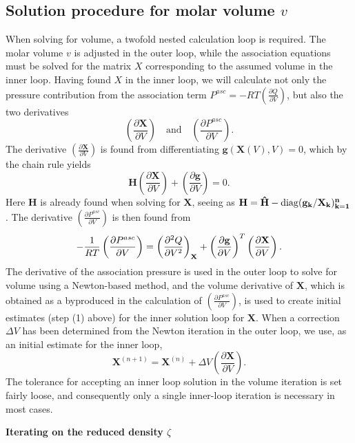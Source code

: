 \documentclass[english]{../thermomemo/thermomemo}
\newcommand{\mbf}[0]{\mathbf}
\newcommand*{\pder}[2]{\left(\frac{\partial #1}{\partial #2}\right)}
\newcommand*{\pdder}[2]{\left(\frac{\partial^2 #1}{\partial #2^2}\right)}
\newcommand{\z}{\zeta}
\begin{document}
\subsection{Solution procedure for molar volume $v$}
When solving for volume, a twofold nested calculation loop is required. The molar volume $v$ is adjusted in the outer loop, while the association equations must be solved for the matrix $X$ corresponding to the assumed volume in the inner loop. Having found $X$ in the inner loop, we will calculate not only the pressure contribution from the association term $P^{asc} = -RT \pder{Q}{V}$, but also the two derivatives
\begin{equation}
  \label{advDeriv}
  \pder{\mbf X}{V} \quad \text{and} \quad \pder{P^{asc}}{V}.
\end{equation}
The derivative $\pder{\mbf X}{V}$ is found from differentiating $\mbf g(\mbf X(V),V) = 0$, which by the chain rule yields
\begin{equation}
  \mbf H \pder{\mbf X}{V} + \pder{\mbf g}{V} = 0.
\end{equation}
Here $\mbf H$ is already found when solving for $\mbf X$, seeing as $\bf H = \bf{\hat H} - \mathrm{diag}(\bf g_k/\bf X_k)_{k=1}^n$. The derivative $\pder{P^{asc}}{V}$ is then found from
\begin{equation}
  -\frac{1}{RT} \pder{P^{asc}}{V} = \pdder{Q}{V}_{\mbf X} + \pder{\bf g}{V}^T \pder{\bf X}{V}.
\end{equation}
The derivative of the association pressure is used in the outer loop to solve for volume using a Newton-based method, and the volume derivative of $\mbf X$, which is obtained as a byproduced in the calculation of $\pder{P^{asc}}{V}$, is used to create initial estimates (step (1) above) for the inner solution loop for $\mbf X$. When a correction $\Delta V$ has been determined from the Newton iteration in the outer loop, we use, as an initial estimate for the inner loop,
\begin{equation}
  \mbf X^{(n+1)} = \mbf X^{(n)} + \Delta V \pder{\mbf X}{V}.
\end{equation}
The tolerance for accepting an inner loop solution in the volume iteration is set fairly loose, and consequently only a single inner-loop iteration is necessary in most cases.

\textbf{Iterating on the reduced density $\z$}
\end{document}
